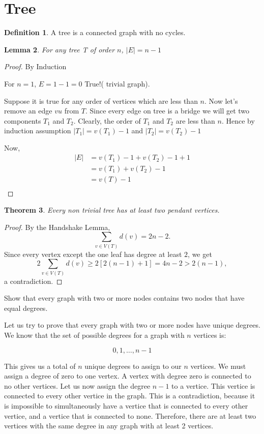 \documentclass{article}
\newtheorem{thm}{Theorem}[section]
\newtheorem{lem}[thm]{Lemma}
\theoremstyle{definition}
\newtheorem{defn}[thm]{Definition}
\begin{document}
\section{Tree}

\begin{defn}
A tree is a connected graph with no cycles.
\end{defn}

\begin{lem}
For any tree T of order $n$, $|E|=n-1$
\end{lem}
\begin{proof}
By Induction

For $n=1$, $E=1-1=0$ True!( trivial graph).

Suppose it is true for any order of vertices which are less than $ n$.
Now let's remove an edge $vu$ from $T$. Since every edge on tree is a bridge we will get two components $T_1$ and $T_2$. Clearly, the order of $T_1$ and $T_2$ are less than $n$. Hence by induction assumption $|T_1|=v(T_1)-1$ and $|T_2|=v(T_2)-1$

Now,
\begin{align*}
|E|&=v(T_1)-1+v(T_2)-1+1\\
&=v(T_1)+v(T_2)-1\\
&=v(T)-1\\
\end{align*}


\end{proof}

\begin{thm}
Every non trivial tree has at least two pendant vertices.
\end{thm}
\begin{proof}
By the Handshake Lemma, $$\sum_{v \in V(T)} d(v) = 2n - 2.$$ Since every vertex except the one leaf has degree at least $2$, we get $$2 \sum_{v \in V(T)} d(v) \geq 2[2(n-1) + 1] = 4n - 2 > 2(n-1),$$ a contradiction.
\end{proof}

Show that every graph with two or more nodes contains two nodes that have equal
degrees.

Let us try to prove that every graph with two or more nodes have unique
degrees.  We know that the set of possible degrees for a graph with $n$ vertices
is:

\[
0,1,\ldots,n-1
\]

This gives us a total of $n$ unique degrees to assign to our $n$ vertices. We
must assign a degree of zero to one vertex. A vertex with degree zero is
connected to no other vertices.  Let us now assign the degree $n-1$ to a
vertice.  This vertice is connected to every other vertice in the graph.
This is a contradiction, because it is impossible to simultaneously have a
vertice that is connected to every other vertice, and a vertice that is
connected to none.  Therefore, there are at least two vertices with the same
degree in any graph with at least 2 vertices. 
\end{document}
